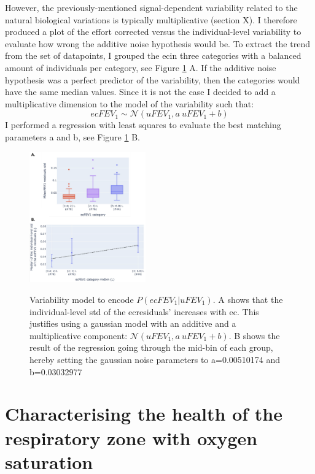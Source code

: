 However, the previously-mentioned signal-dependent variability related to the natural biological variations is typically multiplicative (section X). I therefore produced a plot of the effort corrected \F versus the individual-level variability to evaluate how wrong the additive noise hypothesis would be. To extract the trend from the set of datapoints, I grouped the ec\F in three categories with a balanced amount of individuals per category, see Figure \ref{fig:fev1_noise_model} A. If the additive noise hypothesis was a perfect predictor of the variability, then the categories would have the same median values. Since it is not the case I decided to add a multiplicative dimension to the model of the \F variability such that:
\begin{equation}
    ecF\!EV_1 \sim \mathcal{N}(uF\!EV_1, a\ uF\!EV_1 + b)
\end{equation}
I performed a regression with least squares to evaluate the best matching parameters a and b, see Figure \ref{fig:fev1_noise_model} B. 

\begin{figure}[!h]
    \caption{Variability model to encode $P(ecF\!EV_1 | uF\!EV_1)$.  A shows that the individual-level std of the ec\F residuals' increases with ec\F. This justifies using a gaussian model with an additive and a multiplicative component: $\mathcal{N}(uF\!EV_1, a\ uF\!EV_1 + b)$. B shows the result of the regression going through the mid-bin of each group, hereby setting the gaussian noise parameters to a=0.00510174 and b=0.03032977}
    \centering
    \includegraphics[width=50mm]{Chapter1/Figs/fev1_noise_model.png}
    \label{fig:fev1_noise_model}
\end{figure}


\section{Characterising the health of the respiratory zone with oxygen saturation}

